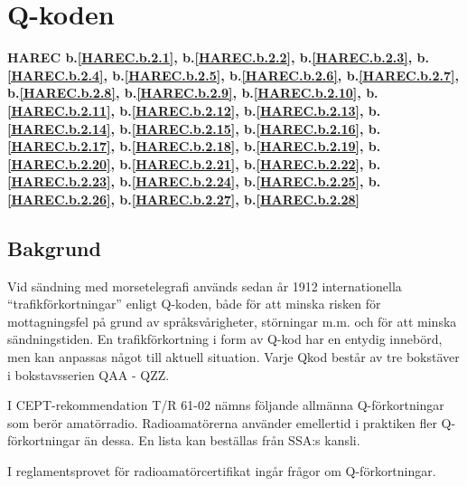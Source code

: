 \section{Q-koden}
\textbf{
HAREC b.\ref{HAREC.b.2.1}\label{myHAREC.b.2.1},
 b.\ref{HAREC.b.2.2}\label{myHAREC.b.2.2},
 b.\ref{HAREC.b.2.3}\label{myHAREC.b.2.3},
 b.\ref{HAREC.b.2.4}\label{myHAREC.b.2.4},
 b.\ref{HAREC.b.2.5}\label{myHAREC.b.2.5},
 b.\ref{HAREC.b.2.6}\label{myHAREC.b.2.6},
 b.\ref{HAREC.b.2.7}\label{myHAREC.b.2.7},
 b.\ref{HAREC.b.2.8}\label{myHAREC.b.2.8},
 b.\ref{HAREC.b.2.9}\label{myHAREC.b.2.9},
 b.\ref{HAREC.b.2.10}\label{myHAREC.b.2.10},
 b.\ref{HAREC.b.2.11}\label{myHAREC.b.2.11},
 b.\ref{HAREC.b.2.12}\label{myHAREC.b.2.12},
 b.\ref{HAREC.b.2.13}\label{myHAREC.b.2.13},
 b.\ref{HAREC.b.2.14}\label{myHAREC.b.2.14},
 b.\ref{HAREC.b.2.15}\label{myHAREC.b.2.15},
 b.\ref{HAREC.b.2.16}\label{myHAREC.b.2.16},
 b.\ref{HAREC.b.2.17}\label{myHAREC.b.2.17},
 b.\ref{HAREC.b.2.18}\label{myHAREC.b.2.18},
 b.\ref{HAREC.b.2.19}\label{myHAREC.b.2.19},
 b.\ref{HAREC.b.2.20}\label{myHAREC.b.2.20},
 b.\ref{HAREC.b.2.21}\label{myHAREC.b.2.21},
 b.\ref{HAREC.b.2.22}\label{myHAREC.b.2.22},
 b.\ref{HAREC.b.2.23}\label{myHAREC.b.2.23},
 b.\ref{HAREC.b.2.24}\label{myHAREC.b.2.24},
 b.\ref{HAREC.b.2.25}\label{myHAREC.b.2.25},
 b.\ref{HAREC.b.2.26}\label{myHAREC.b.2.26},
 b.\ref{HAREC.b.2.27}\label{myHAREC.b.2.27},
 b.\ref{HAREC.b.2.28}\label{myHAREC.b.2.28}
}

\subsection{Bakgrund}

Vid sändning med morsetelegrafi används sedan år 1912 internationella
``trafikförkortningar'' enligt Q-koden, både för att minska risken för
mottagningsfel på grund av språksvårigheter, störningar m.m. och för
att minska sändningstiden. En trafikförkortning i form av Q-kod har en
entydig innebörd, men kan anpassas något till aktuell situation. Varje
Qkod består av tre bokstäver i bokstavsserien QAA - QZZ.

I CEPT-rekommendation T/R 61-02 nämns följande allmänna
Q-förkortningar som berör amatörradio.  Radioamatörerna använder
emellertid i praktiken fler Q-förkortningar än dessa. En lista kan
beställas från SSA:s kansli.

I reglamentsprovet för radioamatörcertifikat ingår frågor om Q-förkortningar.

